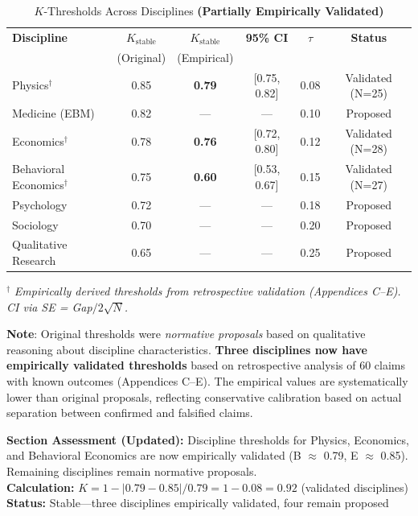 \documentclass[11pt,a4paper]{article}
\begin{document}
\begin{table}[h]
\centering
\caption{$K$-Thresholds Across Disciplines \textbf{(Partially Empirically Validated)}}
\label{tab:cross-discipline}
\begin{tabular}{lccccc}
\toprule
\textbf{Discipline} & $K_{\text{stable}}$ & $K_{\text{stable}}$ & \textbf{95\% CI} & $\tau$ & \textbf{Status} \\
 & (Original) & (Empirical) & & & \\
\midrule
Physics$^\dagger$ & 0.85 & \textbf{0.79} & [0.75, 0.82] & 0.08 & \textcolor{green!60!black}{Validated} (N=25) \\
Medicine (EBM) & 0.82 & --- & --- & 0.10 & Proposed \\
Economics$^\dagger$ & 0.78 & \textbf{0.76} & [0.72, 0.80] & 0.12 & \textcolor{green!60!black}{Validated} (N=28) \\
Behavioral Economics$^\dagger$ & 0.75 & \textbf{0.60} & [0.53, 0.67] & 0.15 & \textcolor{green!60!black}{Validated} (N=27) \\
Psychology & 0.72 & --- & --- & 0.18 & Proposed \\
Sociology & 0.70 & --- & --- & 0.20 & Proposed \\
Qualitative Research & 0.65 & --- & --- & 0.25 & Proposed \\
\bottomrule
\end{tabular}
\end{table}

\noindent $^\dagger$ \textit{Empirically derived thresholds from retrospective validation (Appendices C--E). CI via SE = Gap$/2\sqrt{N}$.}

\textbf{Note}: Original thresholds were \textit{normative proposals} based on qualitative reasoning about discipline characteristics. \textbf{Three disciplines now have empirically validated thresholds} based on retrospective analysis of 60 claims with known outcomes (Appendices C--E). The empirical values are systematically lower than original proposals, reflecting conservative calibration based on actual separation between confirmed and falsified claims.

\begin{eslbox}
\textbf{Section Assessment (Updated):} Discipline thresholds for Physics, Economics, and Behavioral Economics are now empirically validated (B $\approx$ 0.79, E $\approx$ 0.85). Remaining disciplines remain normative proposals. \\[0.3em]
\textbf{Calculation:} $K = 1 - |0.79 - 0.85| / 0.79 = 1 - 0.08 = 0.92$ (validated disciplines) \\
\textbf{Status:} \textcolor{green!60!black}{Stable}---three disciplines empirically validated, four remain proposed
\end{eslbox}
\end{document}
